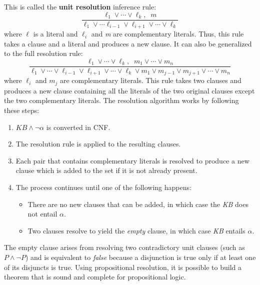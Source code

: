 \documentclass{article}
\begin{document}
This is called the \textbf{unit resolution} inference rule:
\[\frac{\ell_1 \vee \cdots \vee \ell_k,\;\; m}{\ell_1\vee \cdots \ell_{i-1}\vee\ell_{i+1}\vee \cdots \vee \ell_k}\]
where $\ell$ is a literal and $\ell_i$ and \textit{m} are complementary literals. Thus, this rule takes a clause and a literal and produces a new clause. It can also be generalized to the full resolution rule:
\[\frac{\ell_1\vee\cdots\vee\ell_k,\;\; m_1\vee\cdots\vee m_n}{\ell_1\vee\cdots\vee\ell_{i-1}\vee\ell_{i+1}\vee\cdots\vee\ell_k\vee m_1 \vee m_{j-1}\vee m_{j+1}\vee\cdots\vee m_n}\]
where $\ell_i$ and $m_j$ are complementary literals. This rule takes two clauses and produces a new clause containing all the literals of the two original clauses except the two complementary literals. The resolution algorithm works by following these steps:
\begin{enumerate}
    \item $KB \land \neg \alpha$ is converted in CNF.
    \item The resolution rule is applied to the resulting clauses.
    \item Each pair that contains complementary literals is resolved to produce a new clause which is added to the set if it is not already present.
    \item The process continues until one of the following happens:
    \begin{itemize}
        \item There are no new clauses that can be added, in which case the \textit{KB} does not entail $\alpha$.
        \item Two clauses resolve to yield the \textit{empty} clause, in which case \textit{KB} entails $\alpha$.
    \end{itemize}
\end{enumerate}

The empty clause arises from resolving two contradictory unit clauses (such as $P \land \neg P$) and is equivalent to \textit{false} because a disjunction is true only if at least one of its disjuncts is true. Using propositional resolution, it is possible to build a theorem that is sound and complete for propositional logic.
\end{document}

